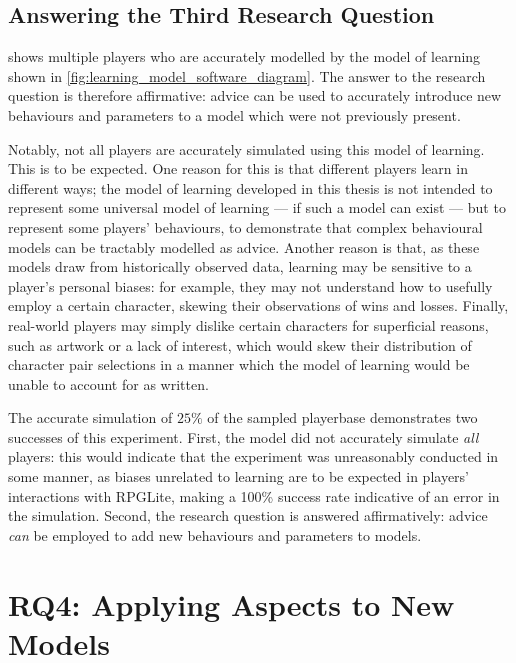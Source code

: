 \subsection{Answering the Third Research Question}

 shows
multiple players who are accurately modelled by the \aspectoriented model of
learning shown in \cref{fig:learning_model_software_diagram}.
The answer to the research question is therefore affirmative: advice can be used
to accurately introduce new behaviours and parameters to a model which were not
previously present.

Notably, not all players are accurately simulated using this model of learning.
This is to be expected. One reason for this is that different players learn in
different ways; the model of learning developed in this thesis is not intended
to represent some universal model of learning --- if such a model can exist ---
but to represent some players' behaviours, to demonstrate that complex
behavioural models can be tractably modelled as advice. Another reason is that,
as these models draw from historically observed data, learning may be sensitive
to a player's personal biases: for example, they may not understand how to
usefully employ a certain character, skewing their observations of wins and
losses. Finally, real-world players may simply dislike certain characters for
superficial reasons, such as artwork or a lack of interest, which would skew
their distribution of character pair selections in a manner which the model of
learning would be unable to account for as written.

The accurate simulation of $25\%$ of the sampled playerbase demonstrates two
successes of this experiment. First, the model did not accurately simulate
\emph{all} players: this would indicate that the experiment was unreasonably
conducted in some manner, as biases unrelated to learning are to be expected in
players' interactions with RPGLite, making a 100\% success rate indicative of an
error in the simulation. Second, the research question is answered
affirmatively: advice \emph{can} be employed to add new behaviours and
parameters to models. 




\section{RQ4: Applying Aspects to New Models}
\label{sec:rq4}


